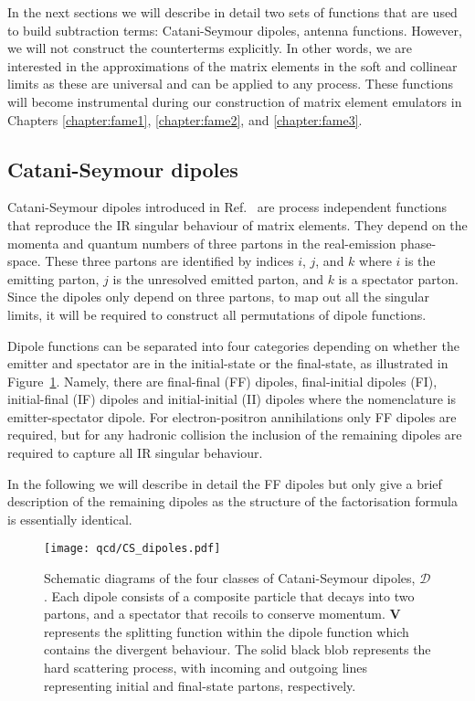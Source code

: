 \documentclass[main.tex]{subfiles}
\begin{document}
    In the next sections we will describe in detail two sets of functions
    that are used to build subtraction terms: Catani-Seymour dipoles,
    antenna functions. However, we will not construct the counterterms explicitly.
    In other words, we are interested in the approximations of the matrix elements
    in the soft and collinear limits as these are universal and can
    be applied to any process. These functions will become instrumental
    during our construction of matrix element emulators in Chapters
    \ref{chapter:fame1}, \ref{chapter:fame2}, and \ref{chapter:fame3}.

\subsection{Catani-Seymour dipoles}\label{sec:CS_dipoles}
    Catani-Seymour dipoles introduced in Ref.~\cite{Catani:1996vz}
    are process independent functions that reproduce the IR
    singular behaviour of matrix elements. They depend on the
    momenta and quantum numbers of three partons in the real-emission
    phase-space. These three partons are identified by indices
    $i$, $j$, and $k$ where $i$ is the emitting parton, $j$ is
    the unresolved emitted parton, and $k$ is a spectator parton.
    Since the dipoles only depend on three partons, to map out
    all the singular limits, it will be required to construct all
    permutations of dipole functions.

    Dipole functions can be separated into four categories
    depending on whether the emitter and spectator are in the
    initial-state or the final-state, as illustrated in Figure~\ref{fig:CS_dipoles}.
    Namely, there are final-final (FF) dipoles, final-initial dipoles (FI),
    initial-final (IF) dipoles and initial-initial (II) dipoles where
    the nomenclature is emitter-spectator dipole.
    For electron-positron annihilations only FF dipoles are required,
    but for any hadronic collision the inclusion of the remaining
    dipoles are required to capture all IR singular behaviour.

    In the following we will describe in detail the FF dipoles
    but only give a brief description of the remaining dipoles as
    the structure of the factorisation formula is essentially identical.

    \begin{figure}
        \texttt{[image: qcd/CS\_dipoles.pdf]}
        \caption{Schematic diagrams of the four classes of Catani-Seymour
        dipoles, $\mathcal{D}$. Each dipole consists of a composite particle
        that decays into two partons, and a spectator that recoils
        to conserve momentum. $\boldsymbol{V}$ represents the splitting
        function within the dipole function which contains the divergent
        behaviour. The solid black blob represents the hard scattering process,
        with incoming and outgoing lines representing initial and final-state
        partons, respectively.}
        \label{fig:CS_dipoles}
    \end{figure}
\end{document}
